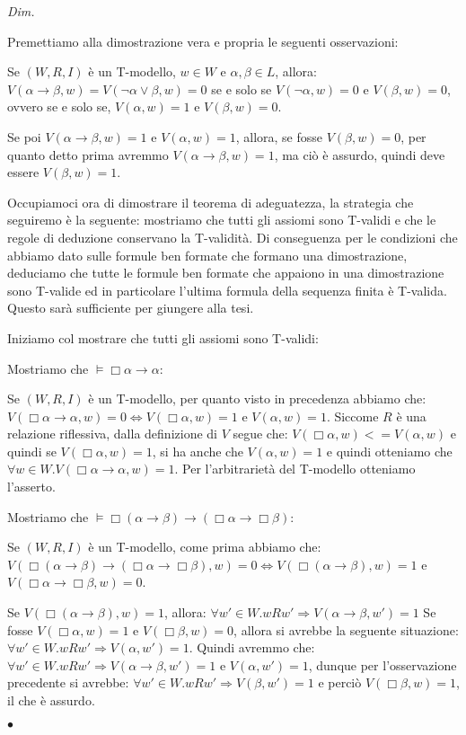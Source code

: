 \documentclass[a4paper, titlepage, 12pt]{report}
\newenvironment{proof}
    {\textit{Dim.}
    }
    {\begin{flushright}$\bullet$\end{flushright}
    }
\begin{document}
\begin{proof}

Premettiamo alla dimostrazione vera e propria le seguenti osservazioni:

Se $(W, R, I)$ è un T-modello, $w \in W$ e $\alpha, \beta \in L$, allora:
$V(\alpha \rightarrow \beta, w) = V(\neg \alpha \lor \beta, w) = 0$ se e solo se
$V(\neg \alpha, w) = 0$ e $V(\beta, w) = 0$, ovvero se e solo se, $V(\alpha, w) = 1$ e $V(\beta, w) = 0$.

Se poi $V(\alpha \rightarrow \beta, w) = 1$ e $V(\alpha, w) = 1$, allora, se fosse
$V(\beta, w) = 0$, per quanto detto prima avremmo $V(\alpha \rightarrow \beta, w) = 1$, ma ciò
è assurdo, quindi deve essere $V(\beta, w) = 1$.

Occupiamoci ora di dimostrare il teorema di adeguatezza, la strategia che seguiremo è la seguente:
mostriamo che tutti gli assiomi sono T-validi e che le regole di deduzione conservano la T-validità.
Di conseguenza per le condizioni che abbiamo dato sulle formule ben formate che formano una dimostrazione,
deduciamo che tutte le formule ben formate che appaiono in una dimostrazione sono T-valide
ed in particolare l'ultima formula della sequenza finita è T-valida.
Questo sarà sufficiente per giungere alla tesi.

Iniziamo col mostrare che tutti gli assiomi sono T-validi:

Mostriamo che $\vDash \Box \alpha \rightarrow \alpha$:

Se $(W, R, I)$ è un T-modello, per quanto visto in precedenza abbiamo che:
$V(\Box \alpha \rightarrow \alpha, w) = 0 \Leftrightarrow V(\Box \alpha, w) = 1$ e $V(\alpha, w) = 1$.
Siccome $R$ è una relazione riflessiva, dalla definizione di $V$ segue che:
$V(\Box \alpha, w) <= V(\alpha, w)$ e quindi se $V(\Box \alpha, w) = 1$, si ha anche che
$V(\alpha, w) = 1$ e quindi otteniamo che
$\forall w \in W. V(\Box \alpha \rightarrow \alpha, w) = 1$. Per l'arbitrarietà
del T-modello otteniamo l'asserto.

Mostriamo che $\vDash \Box (\alpha \rightarrow \beta) \rightarrow (\Box \alpha \rightarrow \Box \beta)$:

Se $(W, R, I)$ è un T-modello, come prima abbiamo che:
$V(\Box (\alpha \rightarrow \beta) \rightarrow (\Box \alpha \rightarrow \Box \beta), w) = 0
\Leftrightarrow V(\Box (\alpha \rightarrow \beta), w) = 1$ e $V(\Box \alpha \rightarrow \Box \beta, w) = 0$.

Se $V(\Box(\alpha \rightarrow \beta), w) = 1$, allora: $\forall w' \in W. wRw' \Rightarrow V(\alpha \rightarrow \beta, w') = 1$
Se fosse $V(\Box \alpha, w) = 1$ e $V(\Box \beta, w) = 0$, allora si avrebbe la seguente
situazione: $\forall w' \in W. wRw' \Rightarrow V(\alpha, w') = 1$. Quindi avremmo che:
$\forall w' \in W. wRw' \Rightarrow V(\alpha \rightarrow \beta, w') = 1$ e $V(\alpha, w') = 1$,
dunque per l'osservazione precedente si avrebbe: $\forall w' \in W. wRw' \Rightarrow V(\beta, w') = 1$
e perciò $V(\Box \beta, w) = 1$, il che è assurdo.


\end{proof}
\end{document}
